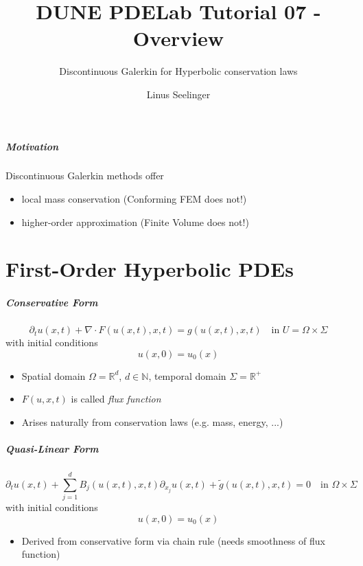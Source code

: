 \documentclass[aspectratio=169,11pt]{beamer}
\title{DUNE PDELab Tutorial 07 - Overview}
\subtitle{Discontinuous Galerkin for Hyperbolic conservation laws }
\author{Linus Seelinger}
\institute[]
  {
  IWR\\
  Heidelberg University
}
\theoremstyle{definition}
\begin{document}


\begin{frame}
\frametitle{Motivation}
Discontinuous Galerkin methods offer
\begin{itemize}
  \item local mass conservation (Conforming FEM does not!)
  \item higher-order approximation (Finite Volume does not!)
\end{itemize}
\end{frame}

\part{First-Order Hyperbolic PDEs}
\begin{frame}
  \partpage
\end{frame}

\begin{frame}
\frametitle{Conservative Form}

\begin{equation*}
\label{eq:master_problem}
\partial_t u(x,t) + \nabla\cdot F(u(x,t),x,t) = g(u(x,t),x,t)  \quad\text{in $U=\Omega\times\Sigma$}
\end{equation*}
with initial conditions
\begin{equation*}
u(x,0) = u_0(x)
\end{equation*}

\begin{itemize}
  \item Spatial domain $\Omega=\mathbb{R}^{d}$, $d\in\mathbb{N}$, temporal domain $\Sigma=\mathbb{R}^+$
  \item $F(u,x,t)$ is called \textit{flux function}
  \item Arises naturally from conservation laws (e.g. mass, energy, ...)
\end{itemize}
\end{frame}



\begin{frame}
\frametitle{Quasi-Linear Form}

\begin{equation*}
\label{eq:master_nonconservative_form}
\partial_t u(x,t) + \sum_{j=1}^{d} B_j(u(x,t),x,t) \partial_{x_j} u(x,t) + \tilde{g}(u(x,t),x,t) = 0
\quad\text{in $\Omega\times\Sigma$}
\end{equation*}
with initial conditions
\begin{equation*}
u(x,0) = u_0(x)
\end{equation*}

\begin{itemize}
  \item Derived from conservative form via chain rule (needs smoothness of flux function)
\end{itemize}
\end{frame}
\end{document}
